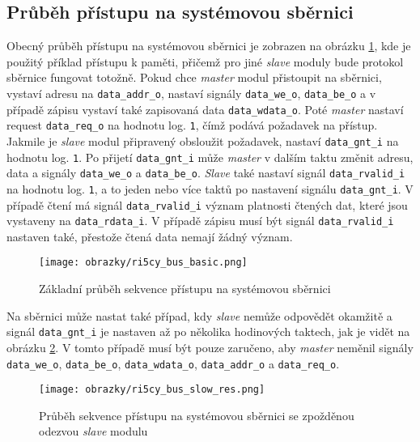 \subsection{Průběh přístupu na systémovou sběrnici}
Obecný průběh přístupu na systémovou sběrnici je zobrazen na obrázku \ref{fig:ri5cy_bus_basic}, kde je použitý příklad přístupu k paměti, přičemž pro jiné \textit{slave} moduly bude protokol sběrnice fungovat totožně. Pokud chce \textit{master} modul přistoupit na sběrnici, vystaví adresu na \texttt{data\_addr\_o}, nastaví signály \texttt{data\_we\_o}, \texttt{data\_be\_o} a v případě zápisu vystaví také zapisovaná data \texttt{data\_wdata\_o}. Poté \textit{master} nastaví request \texttt{data\_req\_o} na hodnotu log. \texttt{1}, čímž podává požadavek na přístup. Jakmile je \textit{slave} modul připravený obsloužit požadavek, nastaví \texttt{data\_gnt\_i} na hodnotu log. \texttt{1}. Po přijetí \texttt{data\_gnt\_i} může \textit{master} v dalším taktu změnit adresu, data a signály \texttt{data\_we\_o} a \texttt{data\_be\_o}. \textit{Slave} také nastaví signál \texttt{data\_rvalid\_i} na hodnotu log. \texttt{1}, a to jeden nebo více taktů po nastavení signálu \texttt{data\_gnt\_i}. V případě čtení má signál \texttt{data\_rvalid\_i} význam platnosti čtených dat, které jsou vystaveny na \texttt{data\_rdata\_i}. V případě zápisu musí být signál \texttt{data\_rvalid\_i} nastaven také, přestože čtená data nemají žádný význam. \cite{ri5cy}
 
\begin{figure}[t]
  \begin{center}
    \texttt{[image: obrazky/ri5cy\_bus\_basic.png]}
  \end{center}
  \caption{Základní průběh sekvence přístupu na systémovou sběrnici \cite{ri5cy}}
	\label{fig:ri5cy_bus_basic}
\end{figure}

Na sběrnici může nastat také případ, kdy \textit{slave} nemůže odpovědět okamžitě a signál \texttt{data\_gnt\_i} je nastaven až po několika hodinových taktech, jak je vidět na obrázku \ref{fig:ri5cy_bus_slow_res}. V tomto případě musí být pouze zaručeno, aby \textit{master} neměnil signály \texttt{data\_we\_o}, \texttt{data\_be\_o}, \texttt{data\_wdata\_o}, \texttt{data\_addr\_o} a \texttt{data\_req\_o}. 

\begin{figure}[H]
  \begin{center}
    \texttt{[image: obrazky/ri5cy\_bus\_slow\_res.png]}
  \end{center}
  \caption{Průběh sekvence přístupu na systémovou sběrnici se zpožděnou odezvou \textit{slave} modulu \cite{ri5cy}}
	\label{fig:ri5cy_bus_slow_res}
\end{figure}


